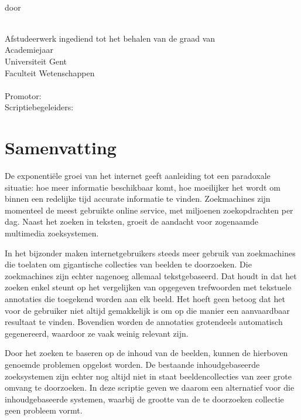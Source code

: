 \newpage
\thispagestyle{plain}

\begin{center}
{\sf\huge \titel }\\[3mm]
door\\
{\Large\auteur{}} \\
\end{center}
\noindent Afstudeerwerk ingediend tot het behalen van de graad van
\richting
\vspace{3mm}\\
Academiejaar \jaar
\vspace{3mm}\\
\noindent Universiteit Gent\\
Faculteit Wetenschappen\\
\vspace{3mm}\\
\noindent Promotor: \promotor\\
\noindent Scriptiebegeleiders: \begeleider\\
\vfill

\section*{Samenvatting}
De exponenti\"ele groei van het internet geeft aanleiding tot een paradoxale
situatie: hoe meer informatie beschikbaar komt, hoe moeilijker het wordt
om binnen een redelijke tijd accurate informatie te vinden. Zoekmachines zijn momenteel
de meest gebruikte online service, met miljoenen zoekopdrachten per dag. Naast het zoeken
in teksten, groeit de aandacht voor zogenaamde multimedia zoeksystemen. 

In het bijzonder maken internetgebruikers steeds meer gebruik van zoekmachines die toelaten om 
gigantische collecties van beelden te doorzoeken. Die zoekmachines zijn echter nagenoeg 
allemaal tekstgebaseerd. Dat houdt in dat het zoeken enkel steunt op het vergelijken van opgegeven 
trefwoorden met tekstuele annotaties die toegekend worden aan elk beeld. Het hoeft geen
betoog dat het voor de gebruiker niet altijd gemakkelijk is om op die manier een aanvaardbaar 
resultaat te vinden. Bovendien worden de annotaties grotendeels automatisch gegenereerd, 
waardoor ze vaak weinig relevant zijn.

Door het zoeken te baseren op de inhoud van de beelden, kunnen de hierboven genoemde problemen 
opgelost worden. De bestaande inhoudgebaseerde zoeksystemen zijn echter nog altijd niet 
in staat beeldencollecties van zeer grote omvang te doorzoeken. In deze scriptie geven 
we daarom een alternatief voor die inhoudgebaseerde systemen, waarbij de grootte van 
de te doorzoeken collectie geen probleem vormt. 


